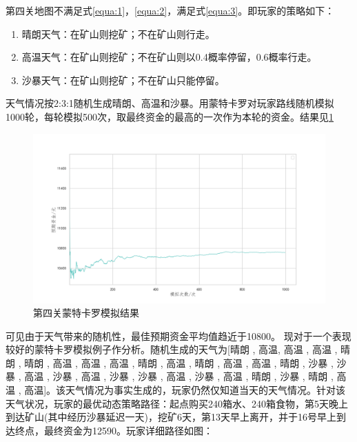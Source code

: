 \documentclass[withoutpre]{cumcmthesis} %
\begin{document}
第四关地图不满足式\cref{equa:1}，\cref{equa:2}，满足式\cref{equa:3}。即玩家的策略如下：
\begin{enumerate}
    \item 晴朗天气：在矿山则挖矿；不在矿山则行走。
    \item 高温天气：在矿山则挖矿；不在矿山则以0.4概率停留，0.6概率行走。
    \item 沙暴天气：在矿山则挖矿；不在矿山只能停留。
\end{enumerate}
天气情况按2:3:1随机生成晴朗、高温和沙暴。用蒙特卡罗对玩家路线随机模拟1000轮，每轮模拟500次，取最终资金的最高的一次作为本轮的资金。结果见\cref{fig:check4}
\begin{figure}[H]
    \centering
    \includegraphics[scale=0.5]{figures/check4.png}
    \caption{第四关蒙特卡罗模拟结果}
    \label{fig:check4}
\end{figure}
可见由于天气带来的随机性，最佳预期资金平均值趋近于10800。
现对于一个表现较好的蒙特卡罗模拟例子作分析。随机生成的天气为[晴朗 , 高温,  高温 ,  高温 ,  晴朗 ,  晴朗 ,  高温 ,  高温 ,  高温 ,  晴朗 ,  高温 ,  晴朗 ,  高温 ,  高温 ,  晴朗 ,  沙暴 ,  沙暴 ,  高温 ,  沙暴 ,  高温 ,  沙暴 ,  沙暴 ,  高温 ,  沙暴 ,  高温 ,  晴朗 ,  沙暴 ,  晴朗 ,  高温 ,  高温]。该天气情况为事实生成的，玩家仍然仅知道当天的天气情况。针对该天气状况，玩家的最优动态策略路径：起点购买240箱水、240箱食物，第5天晚上到达矿山(其中经历沙暴延迟一天)，挖矿6天，第13天早上离开，并于16号早上到达终点，最终资金为12590。玩家详细路径如图：
\end{document}
